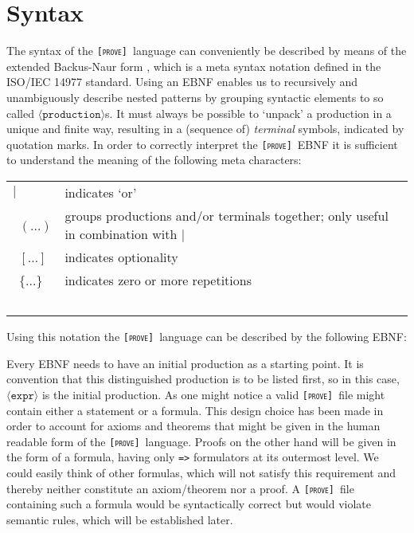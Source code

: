 \documentclass[british]{article}
\providecommand{\tabularnewline}{\\}
\newcommand\prv{bc}
\newcommand\m[1]{\texttt{#1}}
\newcommand\name{\texttt{\textsc{[prove]}}}
\begin{document}
\section{Syntax}

The syntax of the \name\ language can conveniently
be described by means of the extended Backus-Naur form \parencite{Extended}, which is a meta syntax notation defined in the ISO/IEC 14977
\parencite{ISO} standard. Using an EBNF enables us
to recursively and unambiguously describe nested patterns by grouping
syntactic elements to so called $\langle\texttt{production}\rangle$s.
It must always be possible to `unpack' a production in a unique
and finite way, resulting in a (sequence of) \textit{terminal} symbols,
indicated by quotation marks. In order to correctly interpret the
\name\ EBNF it is sufficient to understand
the meaning of the following meta characters:

\bigskip{}

\begin{doublespace}
\begin{tabular}{l|l}
$|$ & indicates `or'\tabularnewline\
$(\dots)$ & groups productions and/or terminals together; only useful in combination
with $|$\tabularnewline\
$[\dots]$ & indicates optionality\tabularnewline\
$\{\dots\}$ & indicates zero or more repetitions\tabularnewline\
\end{tabular}\bigskip{}

\end{doublespace}

Using this notation the \name\ language can be described by the following EBNF:



\medskip{}

Every EBNF needs to have an initial production as a starting point.
It is convention that this distinguished production is to be listed
first, so in this case, $\langle\texttt{expr}\rangle$ is the initial
production. As one might notice a valid \name\ file
might contain either a statement or a formula. This design choice
has been made in order to account for axioms and theorems that might
be given in the human readable form of the \name\ language.
Proofs on the other hand will be given in the form of a formula, having
only \m{=>} formulators at its outermost level. We could easily think
of other formulas, which will not satisfy this requirement and thereby
neither constitute an axiom/theorem nor a proof. A \name\
file containing such a formula would be syntactically correct but
would violate semantic rules, which will be established later. \pagebreak{}
\end{document}
